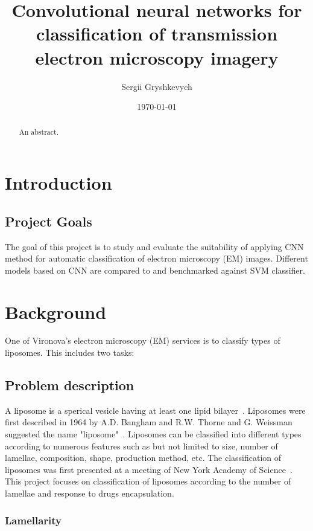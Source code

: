 \documentclass[a4paper, 11pt, table]{article}
\title{Convolutional neural networks for classification of transmission electron microscopy imagery}
\author{Sergii Gryshkevych}
\date{\today}
\begin{document}
\maketitle

\tableofcontents

\begin{abstract}
An abstract.
\end{abstract}

\section{Introduction}



\subsection{Project Goals}

The goal of this project is to study and evaluate the suitability of applying CNN method for automatic classification of electron microscopy (EM) images. Different models based on CNN are compared to and benchmarked against SVM classifier. 


\section{Background}

One of Vironova's electron microscopy (EM) services is to classify types of liposomes. This includes two tasks:



\subsection{Problem description}

A liposome is a sperical vesicle having at least one lipid bilayer~\cite{betageri1993liposome}. Liposomes were first described in 1964 by A.D. Bangham and R.W. Thorne and G. Weissman suggested the name "liposome"~\cite{betageri1993liposome}. Liposomes can be classified into different types according to numerous features such as but not limited to size, number of lamellae, composition, shape, production method, etc. The classification of liposomes was first presented at a meeting of New York Academy of Science~\cite{liposomes1978}. This project focuses on classification of liposomes according to the number of lamellae and response to drugs encapsulation.

\subsubsection{Lamellarity}
\label{sec:lamellarity}
\end{document}
